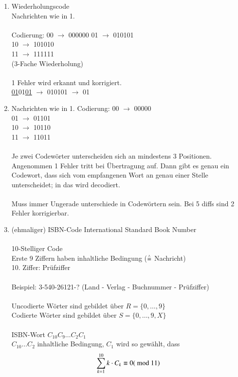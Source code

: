 \begin{enumerate}
\item Wiederholungscode\\
Nachrichten wie in 1.\\
\\
Codierung: 00 $\rightarrow$ 000000
01 $\rightarrow$ 010101\\
10 $\rightarrow$ 101010\\
11 $\rightarrow$ 111111\\
(3-Fache Wiederholung)\\
\\
1 Fehler wird erkannt und korrigiert.\\
\underline{01}01\underline{01} $\rightarrow$ 010101 $\rightarrow$ 01
\item Nachrichten wie in 1.
Codierung: 00 $\rightarrow$ 00000\\
01 $\rightarrow$ 01101\\
10 $\rightarrow$ 10110\\
11 $\rightarrow$ 11011\\
\\
Je zwei Codew\"orter unterscheiden sich an mindestens 3 Positionen.\\
Angenommen 1 Fehler tritt bei \"Ubertragung auf. Dann gibt es genau ein Codewort, dass sich vom empfangenen Wort an genau einer Stelle unterscheidet; in das wird decodiert.\\
\\
Muss immer Ungerade unterschiede in Codew\"ortern sein. Bei 5 diffs sind 2 Fehler korrigierbar.
\item (ehmaliger) ISBN-Code
International Standard Book Number\\
\\
10-Stelliger Code\\
Erste 9 Ziffern haben inhaltliche Bedingung ($\stackrel{\scriptscriptstyle\wedge}{=}$ Nachricht)\\
10. Ziffer: Pr\"ufziffer\\
\\
Beispiel: 3-540-26121-? (Land - Verlag - Buchnummer - Pr\"ufziffer)\\
\\
Uncodierte W\"orter sind gebildet \"uber $R=\{0, \ldots, 9\}$\\
Codierte W\"orter sind gebildet \"uber $S=\{0, \ldots, 9, X\}$\\
\\
ISBN-Wort $C_{10}C_9\ldots C_2C_1$\\
$C_{10}\ldots C_2$ inhaltliche Bedingung, $C_1$ wird so gew\"ahlt, dass
\[
	\sum^{10}_{k=1} k \cdot C_k \equiv 0 (\textrm{ mod } 11)
\]


\end{enumerate}
